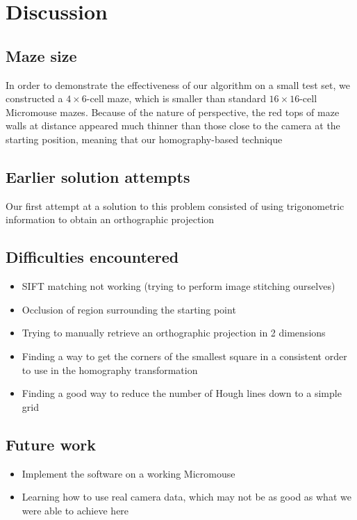 \documentclass[10pt,twocolumn,letterpaper]{article}
\begin{document}


\section{Discussion}
\label{sec:discussion}
\subsection{Maze size} %
\label{sub:maze_size}

In order to demonstrate the effectiveness of our algorithm on a small test set, we constructed a $4\times 6$-cell maze,
which is smaller than standard $16\times 16$-cell Micromouse mazes.  Because of the nature of perspective, the red tops
of maze walls at distance appeared much thinner than those close to the camera at the starting position, meaning that our homography-based technique
\subsection{Earlier solution attempts}
\label{sub:earlierattempts}

Our first attempt at a solution to this problem consisted of using trigonometric information to obtain an orthographic projection 

\subsection{Difficulties encountered}
\label{sub:difficulties}
\begin{itemize}
	\item SIFT matching not working (trying to perform image stitching ourselves)
	\item Occlusion of region surrounding the starting point
	\item Trying to manually retrieve an orthographic projection in 2 dimensions
	\item Finding a way to get the corners of the smallest square in a consistent order to use in the homography
	transformation
	\item Finding a good way to reduce the number of Hough lines down to a simple grid
\end{itemize}

\subsection{Future work}
\label{sub:futurework}
\begin{itemize}
	\item Implement the software on a working Micromouse
	\item Learning how to use real camera data, which may not be as good as what we were able to achieve here
\end{itemize}

{\small


}
\end{document}
